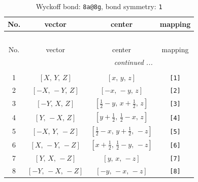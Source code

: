 \documentclass[fleqn,8pt]{jsarticle}
\begin{document}
\begin{longtable}{cccc}
\caption{Wyckoff bond: {\tt 8a@8g}, bond symmetry: {\tt 1}}
 \\
 \hline \hline
No. & vector & center & mapping \\ \hline \endfirsthead

\multicolumn{3}{l}{\tablename\ \thetable{}} \\
 \hline \hline
No. & vector & center & mapping \\ \hline \endhead

 \hline \hline
\multicolumn{3}{r}{\footnotesize\it continued ...} \\ \endfoot

 \hline \hline
\multicolumn{3}{r}{} \\ \endlastfoot

1 & $\left[ X,\, Y,\, Z \right]$ & $\left[ x,\, y,\, z \right]$ & {\tt [1]} \\ \hline
2 & $\left[ - X,\, - Y,\, Z \right]$ & $\left[ - x,\, - y,\, z \right]$ & {\tt [2]} \\ \hline
3 & $\left[ - Y,\, X,\, Z \right]$ & $\left[ \frac{1}{2} - y,\, x + \frac{1}{2},\, z \right]$ & {\tt [3]} \\ \hline
4 & $\left[ Y,\, - X,\, Z \right]$ & $\left[ y + \frac{1}{2},\, \frac{1}{2} - x,\, z \right]$ & {\tt [4]} \\ \hline
5 & $\left[ - X,\, Y,\, - Z \right]$ & $\left[ \frac{1}{2} - x,\, y + \frac{1}{2},\, - z \right]$ & {\tt [5]} \\ \hline
6 & $\left[ X,\, - Y,\, - Z \right]$ & $\left[ x + \frac{1}{2},\, \frac{1}{2} - y,\, - z \right]$ & {\tt [6]} \\ \hline
7 & $\left[ Y,\, X,\, - Z \right]$ & $\left[ y,\, x,\, - z \right]$ & {\tt [7]} \\ \hline
8 & $\left[ - Y,\, - X,\, - Z \right]$ & $\left[ - y,\, - x,\, - z \right]$ & {\tt [8]} \\
\end{longtable}
\end{document}
